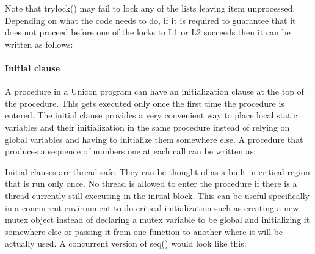
Note that trylock() may fail to lock any of the lists leaving item
unprocessed. Depending on what the code needs to do, if it is required
to guarantee that it does not proceed before one of the locks to
\textsf{L1} or \textsf{L2} succeeds
then it can be written as follows:


\paragraph[Initial clause]{Initial clause}
A procedure in a Unicon program can have an initialization clause at the
top of the procedure. This gets executed only once the first time the
procedure is entered. The initial clause provides a very convenient way
to place local static variables and their initialization in the same
procedure instead of relying on global variables and having to
initialize them somewhere else. A procedure that produces a sequence of
numbers one at each call can be written as:


Initial clauses are thread-safe. They can be thought of as a built-in
critical region that is run only once. No thread is allowed to enter
the procedure if there is a thread currently still executing in the
initial block. This can be useful specifically in a concurrent
environment to do critical initialization such as creating a new mutex
object instead of declaring a mutex variable to be global and
initializing it somewhere else or passing it from one function to
another where it will be actually used. A concurrent version of
\textsf{seq()} would look like this:


